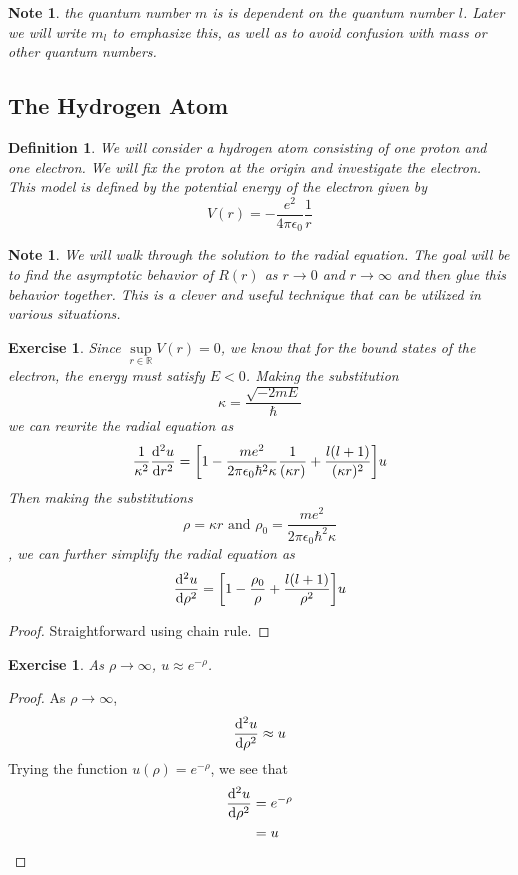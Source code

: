 \documentclass[12pt]{amsart}
\newtheorem{defn}[thm]{Definition}
\newtheorem{note}[thm]{Note}
\newtheorem{ex}[thm]{Exercise}
\newcommand{\ep}{\epsilon}
\newcommand{\R}{\mathbb{R}}
\begin{document}
\begin{note}
the quantum number $m$ is is dependent on the quantum number $l$. Later we will write $m_l$ to emphasize this, as well as to avoid confusion with mass or other quantum numbers. 
\end{note}
\newpage


\subsection{The Hydrogen Atom}

\begin{defn}
We will consider a hydrogen atom consisting of one proton and one electron. We will fix the proton at the origin and investigate the electron. This model is defined by the potential energy of the electron given by $$V(r) = -\frac{e^2}{4\pi \ep_0}\frac{1}{r}$$
\end{defn}

\begin{note}
We will walk through the solution to the radial equation. The goal will be to find the asymptotic behavior of $R(r)$ as $r \rightarrow 0$ and $r \rightarrow \infty$ and then glue this behavior together. This is a clever and useful technique that can be utilized in various situations. 
\end{note}

\begin{ex}
Since $\sup\limits_{r \in \R} V(r) = 0$, we know that for the bound states of the electron, the energy must satisfy $E < 0$. Making the substitution $$\kappa = \frac{\sqrt{-2mE}}{\hbar}$$ we can rewrite the radial equation as $$\frac{1}{\kappa^2}\dv[2]{u}{r} = \bigg[1 - \frac{me^2}{2\pi\ep_0 \hbar^2 \kappa} \frac{1}{(\kappa r)} + \frac{l(l+1)}{(\kappa r)^2}\bigg]u$$ Then making the substitutions $$\rho = \kappa r \text{ and } \rho_0 = \frac{me^2}{2\pi\ep_0 \hbar^2 \kappa}$$, we can further simplify the radial equation as $$\dv[2]{u}{\rho} = \bigg[ 1 - \frac{\rho_0}{\rho} + \frac{l(l+1)}{\rho^2} \bigg]u$$
\end{ex}

\begin{proof}
Straightforward using chain rule.
\end{proof}

\begin{ex}
As $\rho \rightarrow \infty$, $u \approx e^{-\rho}$.
\end{ex}

\begin{proof}
As $\rho \rightarrow \infty$, $$\dv[2]{u}{\rho} \approx u$$ Trying the function $u(\rho) = e^{-\rho}$, we see that 
\begin{align*}
\dv[2]{u}{\rho} 
&= e^{-\rho} \\
&= u
\end{align*}
\end{proof}
\end{document}
